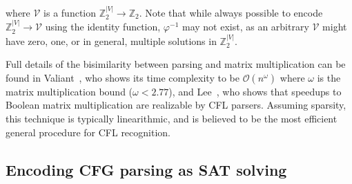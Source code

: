 \documentclass[sigplan,review,anonymous,acmsmall]{acmart}\settopmatter{printfolios=false,printccs=false,printacmref=false}
\begin{document}
\noindent where $\mathcal{V}$ is a function $\mathbb{Z}_2^{|V|}\rightarrow\mathbb{Z}_2$. Note that while always possible to encode $\mathbb{Z}_2^{|V|} \rightarrow \mathcal{V}$ using the identity function, $\varphi^{-1}$ may not exist, as an arbitrary $\mathcal{V}$ might have zero, one, or in general, multiple solutions in $\mathbb{Z}_2^{|V|}$.

\noindent Full details of the bisimilarity between parsing and matrix multiplication can be found in Valiant~\cite{valiant1975general}, who shows its time complexity to be $\mathcal{O}(n^\omega)$ where $\omega$ is the matrix multiplication bound ($\omega < 2.77$), and Lee~\cite{lee2002fast}, who shows that speedups to Boolean matrix multiplication are realizable by CFL parsers. Assuming sparsity, this technique is typically linearithmic, and is believed to be the most efficient general procedure for CFL recognition.



\subsection{Encoding CFG parsing as SAT solving}\label{sec:sat}


%

\newcommand\ddd{\Ddots}
\newcommand\vdd{\Vdots}
\newcommand\cdd{\Cdots}
\newcommand\lds{\ldots}
\newcommand\vno{\varnothing}
\newcommand{\ts}[1]{\textsuperscript{#1}}
\newcommand\non{1\ts{st}}
\newcommand\ntw{2\ts{nd}}
\newcommand\nth{3\ts{rd}}
\newcommand\nfo{4\ts{th}}
\newcommand\nfi{5\ts{th}}
\newcommand\nsi{6\ts{th}}
\newcommand\nse{7\ts{th}}
\newcommand{\vs}[1]{\sigma_{#1}^{\shur}}
\newcommand\rcr{\rowcolor{black!15}}
\newcommand\rcw{\rowcolor{white}}
\newcommand\pcd{\cdot}
\newcommand\pcp{\phantom\cdot}
\newcommand\ppp{\phantom{\nse}}
\end{document}
